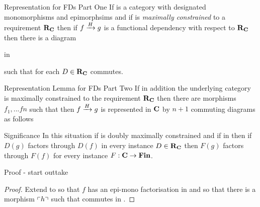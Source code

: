 \begin{frame}{Representation for FDs Part One}{\slidecontext}
If \catcw is a category with designated monomorphisms and epimorphsims  and if \catcw is
\textit{maximally constrained} to a requirement $\reqtc$ then
if $\fundep{H}{f}{g}$  is a functional dependency with respect to $\reqtc$
then there is a diagram\\
\medskip
\begin{minipage}[t][.45cm][t]{5.5cm} %
\scalebox{0.9}{\representationdiagram} 
\hspace*{\fill} in \catc
\end{minipage} 
\pause \begin{minipage}[t]{4.5cm}
such that for each $D \in \reqtc$
\scalebox{0.85}{\mappedrepresentationdiagram}
\hspace*{\fill} commutes.
\end{minipage}
\end{frame}

\begin{frame}{Representation Lemma for FDs Part Two}{\slidecontext}
If in addition the underlying category \catcw is maximally constrained  
 to the requirement $\reqtc$ then
there are morphisms $f_1,...fn$ such that
then $\fundep{H}{f}{g}$ is represented in $\catc$ by  $n+1$ commuting diagrams
as follows
\begin{center}
\scalebox{0.9}{\fullrepresentationdiagram}
\end{center} 
\end{frame}

\begin{frame}{Significance}
In this situation if \catcw is doubly maximally constrained 
and if \scalebox{0.9}{\fgsourcediagram} in \catcw
then if $D(g)$ factors through
$D(f)$ in every instance $D \in \reqtc$  then   
$F(g)$ factors through
$F(f)$ for every instance $F: \catc \morph \Fin$. 
\end{frame}

\begin{frame} {Proof - start outtake}
\begin{proof} Extend \catcw to \catcpw so that $f$ has an epi-mono factorisation in \catcpw
and so that there  is a morphism $\qq{h}$ such that
commutes in \catcp.  
\end{proof}
\end{frame}


